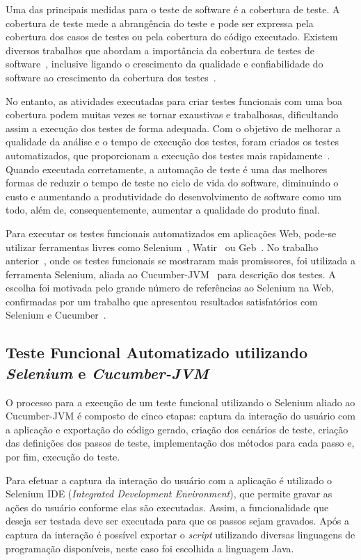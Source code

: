 \documentclass[12pt]{article}
\begin{document}
Uma das principais medidas para o teste de software é a cobertura de teste. A cobertura de teste mede a abrangência do teste e pode ser expressa pela cobertura dos casos de testes ou pela cobertura do código executado. Existem diversos trabalhos que abordam a importância da cobertura de testes de software~\cite{zhu1997software,bieman1996using}, inclusive ligando o crescimento da qualidade e confiabilidade do software ao crescimento da cobertura dos testes~\cite{malaiya2002software}.


No entanto, as atividades executadas para criar testes funcionais com uma boa cobertura podem muitas vezes se tornar exaustivas e trabalhosas, dificultando assim a execução dos testes de forma adequada. Com o objetivo de melhorar a qualidade da análise e o tempo de execução dos testes, foram criados os testes automatizados, que proporcionam a execução dos testes mais rapidamente~\cite{fantinato2005autotest}. Quando executada corretamente, a automação de teste é uma das melhores formas de reduzir o tempo de teste no ciclo de vida do software, diminuindo o custo e aumentando a produtividade do desenvolvimento de software como um todo, além de, consequentemente, aumentar a qualidade do produto final.

Para executar os testes funcionais automatizados em aplicações Web, pode-se utilizar ferramentas livres como Selenium~\cite{selenium}, Watir~\cite{watir} ou Geb~\cite{geb}. No trabalho anterior~\cite{sbqs2015}, onde os testes funcionais se mostraram mais promissores, foi utilizada a ferramenta Selenium, aliada ao Cucumber-JVM~\cite{cucumber} para descrição dos testes. A escolha foi motivada pelo grande número de referências ao Selenium na Web, confirmadas por um trabalho que apresentou resultados satisfatórios com Selenium e Cucumber~\cite{pannutest,sbqs2013}.

\subsection{Teste Funcional Automatizado utilizando \emph{Selenium} e \emph{Cucumber-JVM}}
O processo para a execução de um teste funcional utilizando o Selenium aliado ao Cucumber-JVM é composto de cinco etapas: captura da interação do usuário com a aplicação e exportação do código gerado, criação dos cenários de teste, criação das definições dos passos de teste, implementação dos métodos para cada passo e, por fim, execução do teste.

Para efetuar a captura da interação do usuário com a aplicação é utilizado o Selenium IDE (\emph{Integrated Development Environment}), que permite gravar as ações do usuário conforme elas são executadas. Assim, a funcionalidade que deseja ser testada deve ser executada para que os passos sejam gravados. Após a captura da interação é possível exportar o \emph{script} utilizando diversas linguagens de programação disponíveis, neste caso foi escolhida a linguagem Java.
\end{document}
